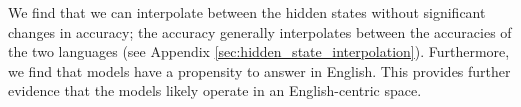 We find that we can interpolate between the hidden states without significant changes in accuracy; the accuracy generally interpolates between the accuracies of the two languages (see Appendix \ref{sec:hidden_state_interpolation}). Furthermore, we find that models have a propensity to answer in English.
This provides further evidence that the models likely operate in an English-centric space. 
